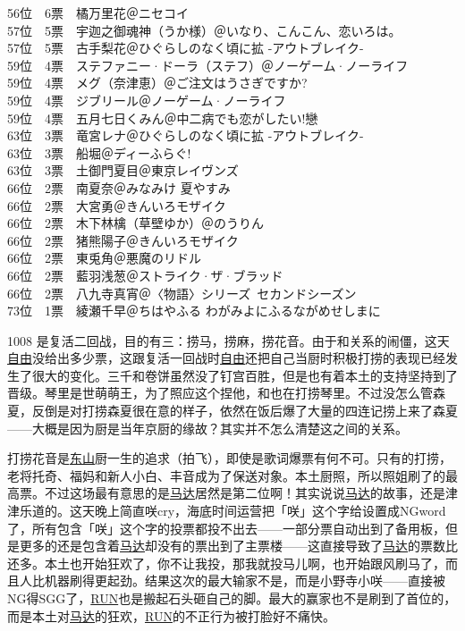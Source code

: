 {    56位　6票　橘万里花＠ニセコイ\\
    57位　5票　宇迦之御魂神（うか様）＠いなり、こんこん、恋いろは。\\
    57位　5票　古手梨花＠ひぐらしのなく頃に拡 -アウトブレイク-\\
    59位　4票　ステファニー·ドーラ（ステフ）＠ノーゲーム·ノーライフ\\
    59位　4票　メグ（奈津恵）＠ご注文はうさぎですか?\\
    59位　4票　ジブリール＠ノーゲーム·ノーライフ\\
    59位　4票　五月七日くみん＠中二病でも恋がしたい!戀\\
    63位　3票　竜宮レナ＠ひぐらしのなく頃に拡 -アウトブレイク-\\
    63位　3票　船堀＠ディーふらぐ!\\
    63位　3票　土御門夏目＠東京レイヴンズ\\
    66位　2票　南夏奈＠みなみけ 夏やすみ\\
    66位　2票　大宮勇＠きんいろモザイク\\
    66位　2票　木下林檎（草壁ゆか）＠のうりん\\
    66位　2票　猪熊陽子＠きんいろモザイク\\
    66位　2票　東兎角＠悪魔のリドル\\
    66位　2票　藍羽浅葱＠ストライク·ザ·ブラッド\\
    66位　2票　八九寺真宵＠〈物語〉シリーズ~セカンドシーズン\\
    73位　1票　綾瀬千早＠ちはやふる わがみよにふるながめせしまに
}

1008 是复活二回战，目的有三：捞马，捞麻，捞花音。由于和关系的闹僵，这天\uline{自由}没给出多少票，这跟复活一回战时\uline{自由}还把自己当厨时积极打捞的表现已经发生了很大的变化。三千和卷饼虽然没了钉宫百胜，但是也有着本土的支持坚持到了晋级。琴里是世萌萌王，为了照应这个捏他，和也在打捞琴里。不过没怎么管森夏，反倒是对打捞森夏很在意的样子，依然在饭后爆了大量的四连记捞上来了森夏——大概是因为厨是当年京厨的缘故？其实并不怎么清楚这之间的关系。

打捞花音是\uline{东山}厨一生的追求（拍飞），即使是歌词爆票有何不可。只有的打捞，老将托奇、福妈和新人小白、丰音成为了保送对象。本土厨照，所以照姐刷了的最高票。不过这场最有意思的是\uline{马达}居然是第二位啊！其实说说\uline{马达}的故事，还是津津乐道的。这天晚上简直咲cry，海底时间运营把「咲」这个字给设置成NGword了，所有包含「咲」这个字的投票都投不出去——一部分票自动出到了备用板，但是更多的还是包含着\uline{马达}却没有的票出到了主票楼——这直接导致了\uline{马达}的票数比还多。本土也开始狂欢了，你不让我投，那我就投马儿啊，也开始跟风刷马了，而且人比机器刷得更起劲。结果这次的最大输家不是，而是小野寺小咲——直接被NG得SGG了，\uline{RUN}也是搬起石头砸自己的脚。最大的赢家也不是刷到了首位的，而是本土对\uline{马达}的狂欢，\uline{RUN}的不正行为被打脸好不痛快。

